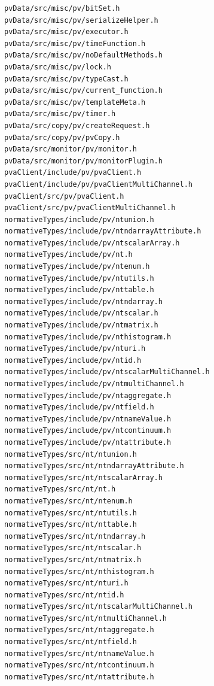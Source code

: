 \documentclass[11pt
  , a4paper
  , article
  , oneside
]{memoir}
\begin{document}
\begin{lstlisting}[style=termstylenumber, caption={Code List}, label={list:nfsroot-file}]
pvData/src/misc/pv/bitSet.h
pvData/src/misc/pv/serializeHelper.h
pvData/src/misc/pv/executor.h
pvData/src/misc/pv/timeFunction.h
pvData/src/misc/pv/noDefaultMethods.h
pvData/src/misc/pv/lock.h
pvData/src/misc/pv/typeCast.h
pvData/src/misc/pv/current_function.h
pvData/src/misc/pv/templateMeta.h
pvData/src/misc/pv/timer.h
pvData/src/copy/pv/createRequest.h
pvData/src/copy/pv/pvCopy.h
pvData/src/monitor/pv/monitor.h
pvData/src/monitor/pv/monitorPlugin.h
pvaClient/include/pv/pvaClient.h
pvaClient/include/pv/pvaClientMultiChannel.h
pvaClient/src/pv/pvaClient.h
pvaClient/src/pv/pvaClientMultiChannel.h
normativeTypes/include/pv/ntunion.h
normativeTypes/include/pv/ntndarrayAttribute.h
normativeTypes/include/pv/ntscalarArray.h
normativeTypes/include/pv/nt.h
normativeTypes/include/pv/ntenum.h
normativeTypes/include/pv/ntutils.h
normativeTypes/include/pv/nttable.h
normativeTypes/include/pv/ntndarray.h
normativeTypes/include/pv/ntscalar.h
normativeTypes/include/pv/ntmatrix.h
normativeTypes/include/pv/nthistogram.h
normativeTypes/include/pv/nturi.h
normativeTypes/include/pv/ntid.h
normativeTypes/include/pv/ntscalarMultiChannel.h
normativeTypes/include/pv/ntmultiChannel.h
normativeTypes/include/pv/ntaggregate.h
normativeTypes/include/pv/ntfield.h
normativeTypes/include/pv/ntnameValue.h
normativeTypes/include/pv/ntcontinuum.h
normativeTypes/include/pv/ntattribute.h
normativeTypes/src/nt/ntunion.h
normativeTypes/src/nt/ntndarrayAttribute.h
normativeTypes/src/nt/ntscalarArray.h
normativeTypes/src/nt/nt.h
normativeTypes/src/nt/ntenum.h
normativeTypes/src/nt/ntutils.h
normativeTypes/src/nt/nttable.h
normativeTypes/src/nt/ntndarray.h
normativeTypes/src/nt/ntscalar.h
normativeTypes/src/nt/ntmatrix.h
normativeTypes/src/nt/nthistogram.h
normativeTypes/src/nt/nturi.h
normativeTypes/src/nt/ntid.h
normativeTypes/src/nt/ntscalarMultiChannel.h
normativeTypes/src/nt/ntmultiChannel.h
normativeTypes/src/nt/ntaggregate.h
normativeTypes/src/nt/ntfield.h
normativeTypes/src/nt/ntnameValue.h
normativeTypes/src/nt/ntcontinuum.h
normativeTypes/src/nt/ntattribute.h
\end{lstlisting}
\end{document}
